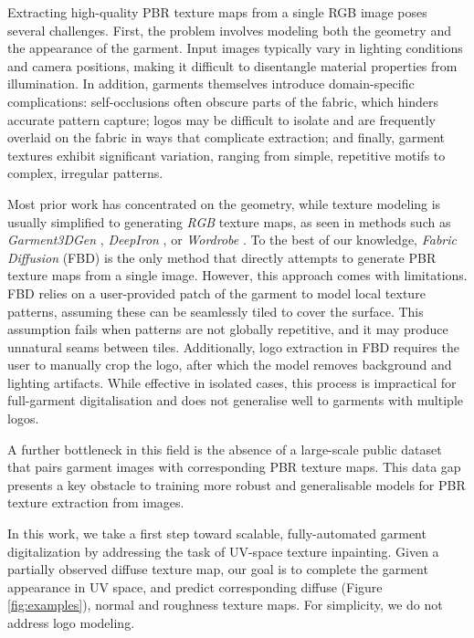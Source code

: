 \documentclass[11pt,twocolumn]{article}
\begin{document}
Extracting high-quality PBR texture maps from a single RGB image poses several challenges. 
First, the problem involves modeling both the geometry and the appearance of the garment. 
Input images typically vary in lighting conditions and camera positions, making it difficult to disentangle material 
properties from illumination. In addition, garments themselves introduce domain-specific complications: 
self-occlusions often obscure parts of the fabric, which hinders accurate pattern capture; 
logos may be difficult to isolate and are frequently overlaid on the fabric in ways that complicate extraction; 
and finally, garment textures exhibit significant variation, ranging from simple, repetitive motifs to complex, 
irregular patterns.

Most prior work has concentrated on the geometry, while texture modeling is usually simplified to generating \textit{RGB} 
texture maps, as seen in methods such as \textit{Garment3DGen} \cite{garment3dgen}, \textit{DeepIron} \cite{deepiron}, 
or \textit{Wordrobe} \cite{WordRobe}. To the best of our knowledge, \textit{Fabric Diffusion} (FBD) \cite{fabricdiffusion} is 
the only method that directly attempts to generate PBR texture maps from a single image. 
However, this approach comes with limitations. FBD relies on a user-provided patch of the garment to model local 
texture patterns, assuming these can be seamlessly tiled to cover the surface. This assumption fails when patterns are not 
globally repetitive, and it may produce unnatural seams between tiles. 
Additionally, logo extraction in FBD requires the user to manually crop the logo, 
after which the model removes background and lighting artifacts. 
While effective in isolated cases, this process is impractical for full-garment digitalisation and does not 
generalise well to garments with multiple logos.

A further bottleneck in this field is the absence of a large-scale public dataset that pairs 
garment images with corresponding PBR texture maps. This data gap presents a key obstacle to 
training more robust and generalisable models for PBR texture extraction from images.

In this work, we take a first step toward scalable, fully-automated garment digitalization by addressing the 
task of UV-space texture inpainting. Given a partially observed diffuse texture map, our goal is to complete 
the garment appearance in UV space, and predict corresponding diffuse (Figure \ref{fig:examples}), normal and roughness 
texture maps. For simplicity, we do not address logo modeling.
\end{document}
